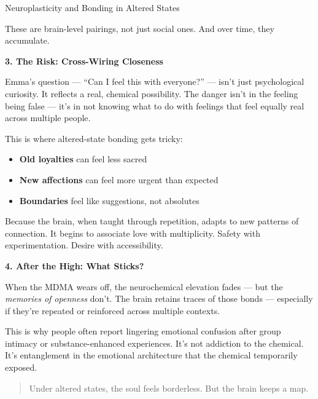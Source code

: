\begin{TechnicalSidebar}{Neuroplasticity and Bonding in Altered States}
  \medskip
  
  
  These are brain-level pairings, not just social ones.
  And over time, they accumulate.
  
  \medskip
  
  \textbf{3. The Risk: Cross-Wiring Closeness}

  \medskip
  
  
  Emma’s question — “Can I feel this with everyone?” — isn’t just psychological curiosity.
  It reflects a real, chemical possibility.
  The danger isn’t in the feeling being false — it’s in not knowing what to do with feelings that feel equally 
  real across multiple people.

  \medskip
  
  
  This is where altered-state bonding gets tricky:

  \medskip
  
  
  \begin{itemize}
    \item \textbf{Old loyalties} can feel less sacred
    \item \textbf{New affections} can feel more urgent than expected
    \item \textbf{Boundaries} feel like suggestions, not absolutes
  \end{itemize}

  \medskip
  
  
  Because the brain, when taught through repetition, adapts to new patterns of connection.
  It begins to associate love with multiplicity.
  Safety with experimentation.
  Desire with accessibility.
  
  \medskip
  

  \textbf{4. After the High: What Sticks?}

  \medskip
  
  
  When the MDMA wears off, the neurochemical elevation fades — but the \textit{memories of openness} don’t.
  The brain retains traces of those bonds — especially if they’re repeated or reinforced across multiple contexts.

  \medskip
  
  
  This is why people often report lingering emotional confusion after group intimacy or substance-enhanced 
  experiences. It’s not addiction to the chemical.
  It’s entanglement in the emotional architecture that the chemical temporarily exposed.
  
  \medskip
  
  \begin{quote}
  Under altered states, the soul feels borderless.
  But the brain keeps a map.
  \end{quote}

\end{TechnicalSidebar}


